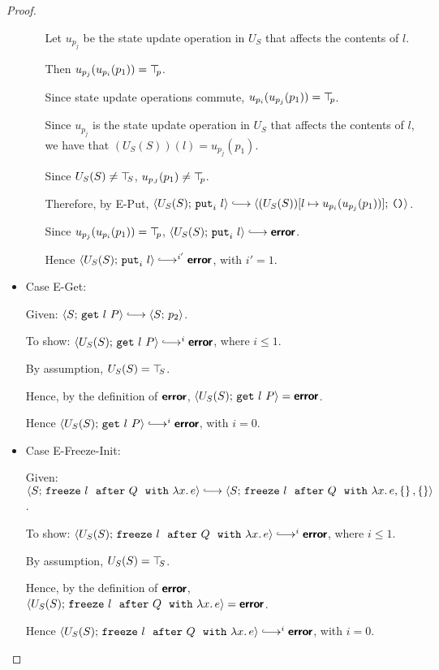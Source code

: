\begin{proof}
\begin{itemize}
\begin{itemize}
        Let $u_{p_j}$ be the state update operation in $U_S$ that
        affects the contents of $l$.

        Then $u_{p_j}(u_{p_i}(p_1)) = \top\hspace{-0.85mm}_{p}$.

        Since state update operations commute, $u_{p_i}(u_{p_j}(p_1))
        = \top\hspace{-0.85mm}_{p}$.

        Since $u_{p_j}$ is the state update operation in $U_S$ that
        affects the contents of $l$, we have that $(U_S(S))(l) =
        u_{p_j}(p_1)$.

        Since $U_S(S) \neq \top\hspace{-0.85mm}_{S}$, $u_{p_J}(p_1) \neq \top\hspace{-0.85mm}_{p}$.

        Therefore, by {\sc E-Put}, $\config{U_S(S)}{\putiexp{l}}
        \parstepsto
        \config{\extSRaw{(U_S(S))}{l}{u_{p_i}(u_{p_j}(p_1))}}{\unit}$.

        Since $u_{p_j}(u_{p_i}(p_1)) = \top\hspace{-0.85mm}_{p}$,
        $\config{U_S(S)}{\putiexp{l}} \parstepsto \error$.

        Hence $\config{U_S(S)}{\putiexp{l}}
        \parstepsto^{i'} \error$, with $i' = 1$.

    \end{itemize}

  \item Case {\sc E-Get}:

    Given: $\config{S}{\getexp{l}{P}} \parstepsto \config{S}{p_2}$.

    To show: $\config{U_S(S)}{\getexp{l}{P}} \parstepsto^i \error$,
    where $i \leq 1$.

    By assumption, $U_S(S) = \top\hspace{-0.85mm}_{S}$.

    Hence, by the definition of $\textbf{\textsf{error}}$,
    $\langle U_S(S);\, \mbox{\texttt{get}}~l~P \rangle = \textbf{\textsf{error}}$.

    Hence $\config{U_S(S)}{\getexp{l}{P}} \parstepsto^i \error$, with
    $i = 0$.

  \item Case {\sc E-Freeze-Init}:

    Given: $\config{S}{\freezeafter{l}{Q}{\lam{x}{e}}} \parstepsto
    \config{S}{\freezeafterfull{l}{Q}{\lam{x}{e}}{\setof{}}{\setof{}}}$.

    To show: $\config{U_S(S)}{\freezeafter{l}{Q}{\lam{x}{e}}}
    \parstepsto^i \error$, where $i \leq 1$.

    By assumption, $U_S(S) = \top\hspace{-0.85mm}_{S}$.

    Hence, by the definition of $\textbf{\textsf{error}}$,
    $\langle U_S(S);\, \mbox{\texttt{freeze}}~l~~{\mbox{\texttt{after}}}~Q~~{\mbox{\texttt{with}}}~\lambda x.\,e \rangle = \textbf{\textsf{error}}$.

    Hence $\config{U_S(S)}{\freezeafter{l}{Q}{\lam{x}{e}}}
    \parstepsto^i \error$, with $i = 0$.


\end{itemize}
\end{proof}
